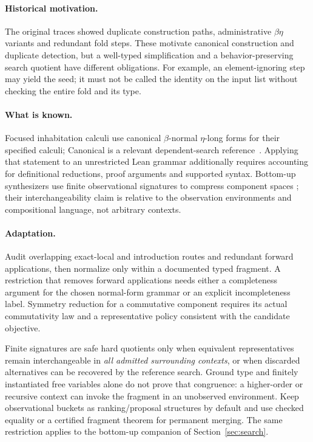 \paragraph{Historical motivation.} The original traces showed duplicate
construction paths, administrative $\beta\eta$ variants and redundant fold
steps. These motivate canonical construction and duplicate detection, but a
well-typed simplification and a behavior-preserving search quotient have
different obligations. For example, an element-ignoring step may yield the
seed; it must not be called the identity on the input list without checking
the entire fold and its type.

\paragraph{What is known.} Focused inhabitation calculi use canonical
$\beta$-normal $\eta$-long forms for their specified calculi; Canonical is a
relevant dependent-search reference~\cite{canonical}. Applying that statement
to an unrestricted Lean grammar additionally requires accounting for
definitional reductions, proof arguments and supported syntax. Bottom-up
synthesizers use finite observational signatures to compress component spaces
\cite{transit,escher}; their interchangeability claim is relative to the
observation environments and compositional language, not arbitrary contexts.

\paragraph{Adaptation.} Audit overlapping exact-local and introduction routes
and redundant forward applications, then normalize only within a documented
typed fragment. A restriction that removes forward applications needs either
a completeness argument for the chosen normal-form grammar or an explicit
incompleteness label. Symmetry reduction for a commutative component requires
its actual commutativity law and a representative policy consistent with the
candidate objective.

Finite signatures are safe hard quotients only when equivalent representatives
remain interchangeable in \emph{all admitted surrounding contexts}, or when
discarded alternatives can be recovered by the reference search. Ground type
and finitely instantiated free variables alone do not prove that congruence:
a higher-order or recursive context can invoke the fragment in an unobserved
environment. Keep observational buckets as ranking/proposal structures by default and use checked
equality or a certified fragment theorem for permanent merging. The same
restriction applies to the bottom-up companion of Section~\ref{sec:search}.

